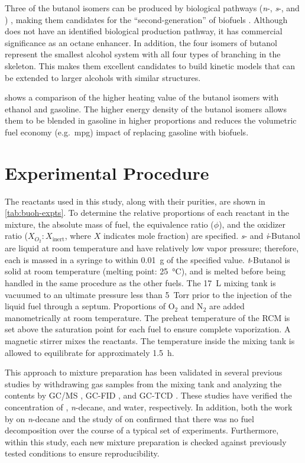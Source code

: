 \documentclass[../main.tex]{subfiles}
\begin{document}
Three of the butanol isomers can be produced
by biological pathways (\textit{n}-, \textit{s}-, and \iBuOH{})
\cite{Nigam2011,Smith2010}, making them candidates for the ``second-generation''
of biofuels \cite{Harvey2011,Nigam2011}. Although \tBuOH{} does not have
an identified biological production pathway, it has commercial significance
as an octane enhancer. In addition, the four isomers of butanol represent
the smallest alcohol system with all four types of branching in the skeleton.
This makes them excellent candidates to build kinetic models that can be
extended to larger alcohols with similar structures.

 shows a comparison of the higher heating value of
the butanol isomers with ethanol and gasoline. The higher energy density
of the butanol isomers allows them to be blended in gasoline in higher
proportions and reduces the volumetric fuel economy (e.g.\ mpg) impact
of replacing gasoline with biofuels.

\section{Experimental Procedure}
\label{sec:buoh-proc}

The reactants used in this study, along with their purities, are shown in
\cref{tab:buoh-expts}. To determine the relative proportions of each
reactant in the mixture, the absolute mass of fuel, the equivalence ratio
($\phi$), and the oxidizer ratio ($X_{O_2}:X_{\mathrm{inert}}$, where $X$
indicates mole fraction) are specified. \textit{s}- and \textit{i}-Butanol are
liquid at room temperature and have relatively low vapor pressure; therefore,
each is massed in a syringe to within \SI{0.01}{g} of the specified
value. \textit{t}-Butanol is solid at room temperature (melting point: \SI{25}{\celsius}),
and is melted before being handled in the same procedure as the other fuels.
The \SI{17}{\liter} mixing tank is vacuumed to an ultimate pressure less than \SI{5}{Torr} prior
to the injection of the liquid fuel through a septum. Proportions of O$_2$ and
N$_2$ are added manometrically at room temperature. The preheat temperature of
the RCM is set above the saturation point for each fuel to ensure complete
vaporization. A magnetic stirrer mixes the reactants. The temperature inside
the mixing tank is allowed to equilibrate for approximately \SI{1.5}{\hour}.

This approach to mixture preparation has been validated in several previous
studies by withdrawing gas samples from the mixing tank and analyzing the
contents by GC/MS \cite{Weber2011}, GC-FID \cite{Kumar2009}, and GC-TCD
\cite{Das2012}. These studies have verified the concentration of
\nBuOH{}, \textit{n}-decane, and water, respectively. In addition,
both the work by \textcite{Kumar2009} on \textit{n}-decane and the study of
\textcite{Weber2011} on \nBuOH{} confirmed that there was no fuel
decomposition over the course of a typical set of experiments. Furthermore,
within this study, each new mixture preparation is checked against previously
tested conditions to ensure reproducibility.
\end{document}
